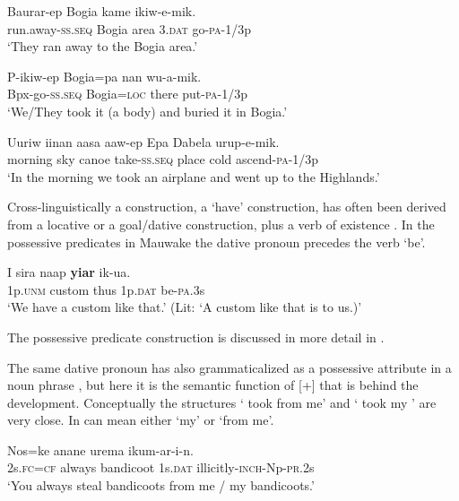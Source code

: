 \ea%
\label{ex:3:x587}
\gll Baurar-ep Bogia kame  ikiw-e-mik. \\
run.away-\textsc{ss}.\textsc{seq} Bogia area 3.\textsc{dat} go-\textsc{pa}-1/3p\\
\glt`They ran away to the Bogia area.'
\z

\ea%
\label{ex:3:x1802}
\gll P-ikiw-ep Bogia=pa nan wu-a-mik. \\
Bpx-go-\textsc{ss}.\textsc{seq} Bogia=\textsc{loc} there put-\textsc{pa}-1/3p\\
\glt`We/They took it (a body) and buried it in Bogia.'
\z

\ea%
\label{ex:3:x1800}
\gll Uuriw iinan aasa aaw-ep Epa Dabela urup-e-mik. \\
morning sky canoe take-\textsc{ss}.\textsc{seq} place cold ascend-\textsc{pa}-1/3p\\
\glt`In the morning we took an airplane and went up to the Highlands.'
\z

Cross-linguistically a  construction, a `have' construction, has often been derived from a locative or a goal/dative construction, plus a verb of existence \citep[50--61]{Heine1997}. In the possessive predicates in Mauwake the dative pronoun precedes the verb \textstyleStyleVernacularWordsItalic{-} `be'. 

\ea%
\label{ex:3:x1788}
\gll I sira naap \textbf{yiar} ik-ua. \\
1p.\textsc{unm} custom thus 1p.\textsc{dat} be-\textsc{pa}.3s\\
\glt`We have a custom like that.' (Lit: `A custom like that is to us.)'
\z

The possessive predicate construction is discussed in more detail in . 

The same dative pronoun has also grammaticalized as a possessive attribute in a noun phrase , but here it is the semantic function of [+]  that is behind the development. Conceptually the structures ` took  from me' and ` took my ' are very close. In   can mean either `my' or `from me'. 

\ea%
\label{ex:3:x581}
\gll Nos=ke anane urema  ikum-ar-i-n. \\
2s.\textsc{fc}=\textsc{cf} always bandicoot 1s.\textsc{dat} illicitly-\textsc{inch}-Np-\textsc{pr}.2s\\
\glt`You always steal bandicoots from me / my bandicoots.'
\z

